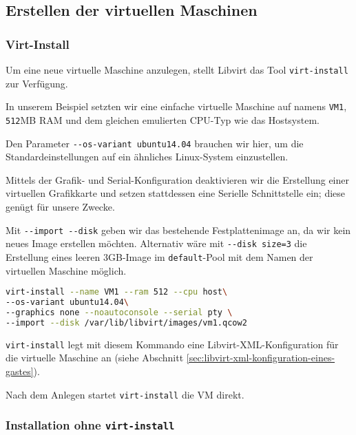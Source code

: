 



\subsection{Erstellen der virtuellen Maschinen}


\subsubsection{Virt-Install}
Um eine neue virtuelle Maschine anzulegen, stellt Libvirt das Tool \lstinline|virt-install| zur Verfügung.

In unserem Beispiel setzten wir eine einfache virtuelle Maschine auf namens \lstinline|VM1|, \lstinline|512|MB RAM und dem gleichen emulierten CPU-Typ wie das Hostsystem.

Den Parameter \lstinline|--os-variant ubuntu14.04| brauchen wir hier, um die Standardeinstellungen auf ein ähnliches Linux-System einzustellen.

Mittels der Grafik- und Serial-Konfiguration deaktivieren wir die Erstellung einer virtuellen Grafikkarte und setzen stattdessen eine Serielle Schnittstelle ein; diese genügt für unsere Zwecke.

Mit \lstinline|--import --disk| geben wir das bestehende Festplattenimage an, da wir kein neues Image erstellen möchten. Alternativ wäre mit \lstinline|--disk size=3| die Erstellung eines leeren 3GB-Image im \lstinline|default|-Pool mit dem Namen der virtuellen Maschine möglich.

\begin{lstlisting}[language=bash]
virt-install --name VM1 --ram 512 --cpu host\
--os-variant ubuntu14.04\
--graphics none --noautoconsole --serial pty \
--import --disk /var/lib/libvirt/images/vm1.qcow2
\end{lstlisting}

\lstinline|virt-install| legt mit diesem Kommando eine Libvirt-XML-Konfiguration für die virtuelle Maschine an (siehe Abschnitt \ref{sec:libvirt-xml-konfiguration-eines-gastes}).

Nach dem Anlegen startet \lstinline|virt-install| die VM direkt.


\subsubsection{Installation ohne \lstinline|virt-install|}

